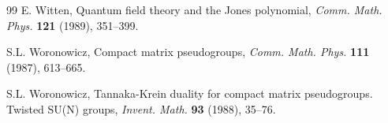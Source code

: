 \documentclass[12pt]{amsbook}
\begin{document}
\begin{thebibliography}{99}
E. Witten, Quantum field theory and the Jones polynomial, {\em Comm. Math. Phys.} {\bf 121} (1989), 351--399.

S.L. Woronowicz, Compact matrix pseudogroups, {\em Comm. Math. Phys.} {\bf 111} (1987), 613--665.

S.L. Woronowicz, Tannaka-Krein duality for compact matrix pseudogroups. Twisted SU(N) groups, {\em Invent. Math.} {\bf 93} (1988), 35--76.

\end{thebibliography}

\baselineskip=14pt

\printindex
\end{document}
